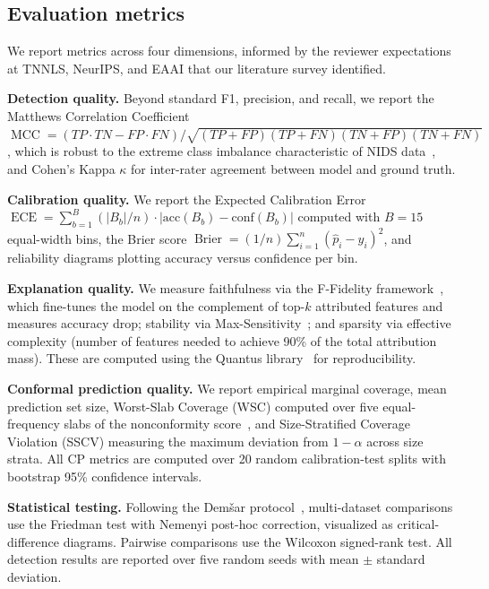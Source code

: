 \documentclass[preprint,review,12pt]{elsarticle}
\DeclareMathOperator{\MCC}{MCC}
\DeclareMathOperator{\ECE}{ECE}
\DeclareMathOperator{\Brier}{Brier}
\begin{document}
\subsection{Evaluation metrics}

We report metrics across four dimensions, informed by the reviewer expectations at TNNLS, NeurIPS, and EAAI that our literature survey identified.

\textbf{Detection quality.} Beyond standard F1, precision, and recall, we report the Matthews Correlation Coefficient $\MCC = (TP \cdot TN - FP \cdot FN) / \sqrt{(TP+FP)(TP+FN)(TN+FP)(TN+FN)}$, which is robust to the extreme class imbalance characteristic of NIDS data~\cite{venturi_cross_dataset_2024}, and Cohen's Kappa $\kappa$ for inter-rater agreement between model and ground truth.

\textbf{Calibration quality.} We report the Expected Calibration Error $\ECE = \sum_{b=1}^B (|B_b|/n) \cdot |\mathrm{acc}(B_b) - \mathrm{conf}(B_b)|$ computed with $B = 15$ equal-width bins, the Brier score $\Brier = (1/n) \sum_{i=1}^n (\hat{p}_i - y_i)^2$, and reliability diagrams plotting accuracy versus confidence per bin.

\textbf{Explanation quality.} We measure faithfulness via the F-Fidelity framework~\cite{f_fidelity_2024}, which fine-tunes the model on the complement of top-$k$ attributed features and measures accuracy drop; stability via Max-Sensitivity~\cite{alvarez_melis_stability}; and sparsity via effective complexity (number of features needed to achieve 90\% of the total attribution mass). These are computed using the Quantus library~\cite{quantus_2023} for reproducibility.

\textbf{Conformal prediction quality.} We report empirical marginal coverage, mean prediction set size, Worst-Slab Coverage (WSC) computed over five equal-frequency slabs of the nonconformity score~\cite{angelopoulos_cp_gentle_2023}, and Size-Stratified Coverage Violation (SSCV) measuring the maximum deviation from $1-\alpha$ across size strata. All CP metrics are computed over 20 random calibration-test splits with bootstrap 95\% confidence intervals.

\textbf{Statistical testing.} Following the Dem\v{s}ar protocol~\cite{demsar_2006}, multi-dataset comparisons use the Friedman test with Nemenyi post-hoc correction, visualized as critical-difference diagrams. Pairwise comparisons use the Wilcoxon signed-rank test. All detection results are reported over five random seeds with mean $\pm$ standard deviation.
\end{document}
